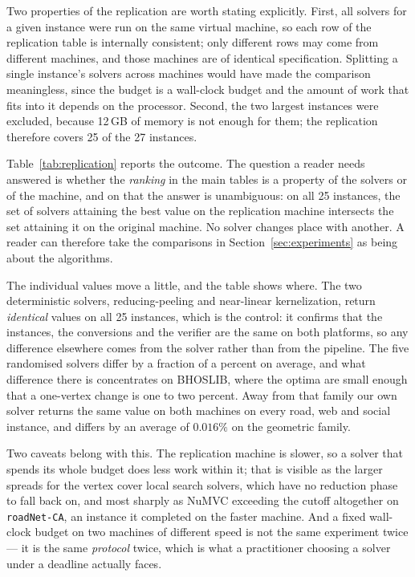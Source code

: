 \documentclass[preprint,12pt]{elsarticle}
\theoremstyle{definition}
\begin{document}
Two properties of the replication are worth stating explicitly. First, all
solvers for a given instance were run on the same virtual machine, so each row
of the replication table is internally consistent; only different rows may come
from different machines, and those machines are of identical specification.
Splitting a single instance's solvers across machines would have made the
comparison meaningless, since the budget is a wall-clock budget and the amount
of work that fits into it depends on the processor. Second, the two largest
instances were excluded, because 12\,GB of memory is not enough for them; the
replication therefore covers 25 of the 27 instances.

Table~\ref{tab:replication} reports the outcome. The question a reader needs
answered is whether the \emph{ranking} in the main tables is a property of the
solvers or of the machine, and on that the answer is unambiguous: on all 25
instances, the set of solvers attaining the best value on the replication
machine intersects the set attaining it on the original machine. No solver
changes place with another. A reader can therefore take the comparisons in
Section~\ref{sec:experiments} as being about the algorithms.

The individual values move a little, and the table shows where. The two
deterministic solvers, reducing-peeling and near-linear kernelization, return
\emph{identical} values on all 25 instances, which is the control: it confirms that
the instances, the conversions and the verifier are the same on both platforms,
so any difference elsewhere comes from the solver rather than from the pipeline.
The five randomised solvers differ by a fraction of a percent on average, and
what difference there is concentrates on BHOSLIB, where the optima are small
enough that a one-vertex change is one to two percent. Away from that family our
own solver returns the same value on both machines on every road, web and social
instance, and differs by an average of $0.016\%$ on the geometric family.

Two caveats belong with this. The replication machine is slower, so a solver
that spends its whole budget does less work within it; that is visible as the
larger spreads for the vertex cover local search solvers, which have no
reduction phase to fall back on, and most sharply as NuMVC exceeding the cutoff
altogether on \texttt{roadNet-CA}, an instance it completed on the faster
machine. And a fixed wall-clock budget on two machines
of different speed is not the same experiment twice --- it is the same
\emph{protocol} twice, which is what a practitioner choosing a solver under a
deadline actually faces.
\end{document}
